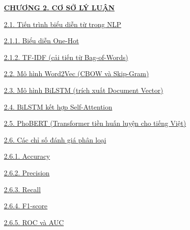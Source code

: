 \documentclass[12pt,a4paper]{article}
\begin{document}
{\noindent\hyperref[sec:chuong2]{\textbf{CHƯƠNG 2. CƠ SỞ LÝ LUẬN} \dotfill \textbf{\pageref*{sec:chuong2}}}\par
\hspace*{0.8cm}\hyperref[sec:tien_trinh_bieu_dien_tu]{2.1. Tiến trình biểu diễn từ trong NLP \dotfill \pageref*{sec:tien_trinh_bieu_dien_tu}}\par
\hspace*{1.6cm}\hyperref[sec:one_hot]{2.1.1. Biểu diễn One-Hot \dotfill \pageref*{sec:one_hot}}\par
\hspace*{1.6cm}\hyperref[sec:bow_tfidf]{2.1.2. TF-IDF (cải tiến từ Bag-of-Words) \dotfill \pageref*{sec:bow_tfidf}}\par
\hspace*{0.8cm}\hyperref[sec:word2vec]{2.2. Mô hình Word2Vec (CBOW và Skip-Gram) \dotfill \pageref*{sec:word2vec}}\par
\hspace*{0.8cm}\hyperref[sec:lstm_doc_rep]{2.3. Mô hình BiLSTM (trích xuất Document Vector) \dotfill \pageref*{sec:lstm_doc_rep}}\par
\hspace*{0.8cm}\hyperref[sec:bilstm_attn]{2.4. BiLSTM kết hợp Self-Attention \dotfill \pageref*{sec:bilstm_attn}}\par
\hspace*{0.8cm}\hyperref[sec:transformer_phobert]{2.5. PhoBERT (Transformer tiền huấn luyện cho tiếng Việt) \dotfill \pageref*{sec:transformer_phobert}}\par
\hspace*{0.8cm}\hyperref[sec:metrics]{2.6. Các chỉ số đánh giá phân loại \dotfill \pageref*{sec:metrics}}\par
\hspace*{1.6cm}\hyperref[sec:metric_acc]{2.6.1. Accuracy \dotfill \pageref*{sec:metric_acc}}\par
\hspace*{1.6cm}\hyperref[sec:metric_prec]{2.6.2. Precision \dotfill \pageref*{sec:metric_prec}}\par
\hspace*{1.6cm}\hyperref[sec:metric_rec]{2.6.3. Recall \dotfill \pageref*{sec:metric_rec}}\par
\hspace*{1.6cm}\hyperref[sec:metric_f1]{2.6.4. F1-score \dotfill \pageref*{sec:metric_f1}}\par
\hspace*{1.6cm}\hyperref[sec:metric_roc_auc]{2.6.5. ROC và AUC \dotfill \pageref*{sec:metric_roc_auc}}\par\vspace{2.5pt}

}
\end{document}
